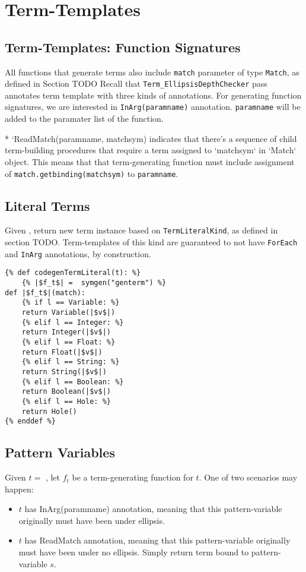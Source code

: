 \section{Term-Templates}

\subsection{Term-Templates: Function Signatures}
All functions that generate terms also include \texttt{match} parameter of type \texttt{Match}, as defined in Section TODO
Recall that \texttt{Term\_EllipsisDepthChecker} pass annotates term template with three kinds of annotations. For generating function signatures, we are interested in \texttt{InArg(paramname)} annotation. \texttt{paramname} will be added to the paramater list of the function. 


* `ReadMatch(paramname, matchsym) indicates that there's a sequence of child term-building procedures that require a term assigned to `matchsym` in `Match` object. This means that that term-generating function must include assignment of \texttt{match.getbinding(matchsym)} to \texttt{paramname}.


\subsection{Literal Terms}

Given \TermLiteral, return new term instance based on \texttt{TermLiteralKind}, as defined in section TODO. Term-templates of this kind are guaranteed to not have \texttt{ForEach} and \texttt{InArg} annotations, by construction.

\begin{verbatim}
{% def codegenTermLiteral(t): %}
	{% |$f_t$| =  symgen("genterm") %}
def |$f_t$|(match):
	{% if l == Variable: %}
	return Variable(|$v$|)
	{% elif l == Integer: %}
	return Integer(|$v$|)
	{% elif l == Float: %}
	return Float(|$v$|)
	{% elif l == String: %}
	return String(|$v$|)
	{% elif l == Boolean: %}
	return Boolean(|$v$|)
	{% elif l == Hole: %}
	return Hole()
{% enddef %}
\end{verbatim}


\subsection{Pattern Variables}

Given $t =$ \PatternVariable, let $f_t$ be a term-generating function for $t$. One of two scenarios may happen:
\begin{itemize}
\item $t$ has InArg(paramname) annotation, meaning that this pattern-variable originally must have been under ellipsis. 
\item $t$ has ReadMatch annotation, meaning that this pattern-variable originally must have been under no ellipsis. Simply return term bound to pattern-variable $s$. 
\end{itemize}

